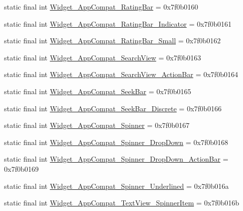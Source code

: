 \begin{CompactItemize}
\item 
static final int \hyperlink{classandroid_1_1support_1_1v7_1_1mediarouter_1_1_r_1_1style_d3accae9c0ed6f29a9e29aecc17d527c}{Widget\_\-AppCompat\_\-RatingBar} = 0x7f0b0160
\item 
static final int \hyperlink{classandroid_1_1support_1_1v7_1_1mediarouter_1_1_r_1_1style_095734dc22c6c80e9f12cc4909540600}{Widget\_\-AppCompat\_\-RatingBar\_\-Indicator} = 0x7f0b0161
\item 
static final int \hyperlink{classandroid_1_1support_1_1v7_1_1mediarouter_1_1_r_1_1style_b52e3ddf553c622af3f7f32d749f094a}{Widget\_\-AppCompat\_\-RatingBar\_\-Small} = 0x7f0b0162
\item 
static final int \hyperlink{classandroid_1_1support_1_1v7_1_1mediarouter_1_1_r_1_1style_ecf6be15a7a6b397e670a4b04506f66d}{Widget\_\-AppCompat\_\-SearchView} = 0x7f0b0163
\item 
static final int \hyperlink{classandroid_1_1support_1_1v7_1_1mediarouter_1_1_r_1_1style_8b77c99b96dee574cfb34f5cb2683b93}{Widget\_\-AppCompat\_\-SearchView\_\-ActionBar} = 0x7f0b0164
\item 
static final int \hyperlink{classandroid_1_1support_1_1v7_1_1mediarouter_1_1_r_1_1style_4338cffa692a81b0187093c734477c96}{Widget\_\-AppCompat\_\-SeekBar} = 0x7f0b0165
\item 
static final int \hyperlink{classandroid_1_1support_1_1v7_1_1mediarouter_1_1_r_1_1style_d388e27998b2f4b44f0f1aa9658bb869}{Widget\_\-AppCompat\_\-SeekBar\_\-Discrete} = 0x7f0b0166
\item 
static final int \hyperlink{classandroid_1_1support_1_1v7_1_1mediarouter_1_1_r_1_1style_22ea521d2852a99b2ac797953c0ef399}{Widget\_\-AppCompat\_\-Spinner} = 0x7f0b0167
\item 
static final int \hyperlink{classandroid_1_1support_1_1v7_1_1mediarouter_1_1_r_1_1style_f4198615169a163aa208f455fb7615c4}{Widget\_\-AppCompat\_\-Spinner\_\-DropDown} = 0x7f0b0168
\item 
static final int \hyperlink{classandroid_1_1support_1_1v7_1_1mediarouter_1_1_r_1_1style_5f7eaec7f48156c69b526a225cbbe9c1}{Widget\_\-AppCompat\_\-Spinner\_\-DropDown\_\-ActionBar} = 0x7f0b0169
\item 
static final int \hyperlink{classandroid_1_1support_1_1v7_1_1mediarouter_1_1_r_1_1style_11b3751c592b66ad0f75ee8836eb22c4}{Widget\_\-AppCompat\_\-Spinner\_\-Underlined} = 0x7f0b016a
\item 
static final int \hyperlink{classandroid_1_1support_1_1v7_1_1mediarouter_1_1_r_1_1style_1cd7ad465c6b3e7ba672b2939614a95a}{Widget\_\-AppCompat\_\-TextView\_\-SpinnerItem} = 0x7f0b016b

\end{CompactItemize}
